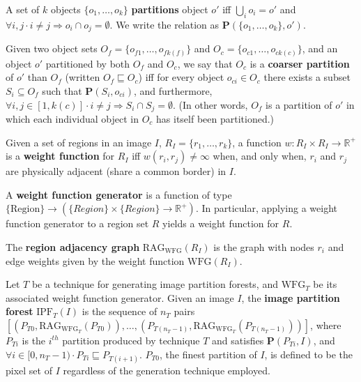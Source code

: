 \begin{definition}
A set of $k$ objects $\{o_1,\ldots,o_k\}$ \textbf{partitions} object $o'$ iff $\bigcup_i o_i = o'$ and $\forall i,j \cdot i \ne j \Rightarrow o_i \cap o_j = \emptyset$. We write the relation as $\mathbf{P}(\{o_1,\ldots,o_k\},o')$.
\end{definition}


\begin{definition}
Given two object sets $O_f = \{o_{f1},\ldots,o_{fk(f)}\}$ and $O_c = \{o_{c1},\ldots,o_{ck(c)}\}$, and an object $o'$ partitioned by both $O_f$ and $O_c$, we say that $O_c$ is a \textbf{coarser partition} of $o'$ than $O_f$ (written $O_f \sqsubseteq O_c$) iff for every object $o_{ci} \in O_c$ there exists a subset $S_i \subseteq O_f$ such that $\mathbf{P}(S_i, o_{ci})$, and furthermore, $\forall i,j \in [1,k(c)] \cdot i \ne j \Rightarrow S_i \cap S_j = \emptyset$. (In other words, $O_f$ is a partition of $o'$ in which each individual object in $O_c$ has itself been partitioned.)
\end{definition}


\begin{definition}
Given a set of regions in an image $I$, $R_I = \{r_1,\ldots,r_k\}$, a function $w : R_I \times R_I \rightarrow \mathbb{R}^{+}$ is a \textbf{weight function} for $R_I$ iff $w(r_i,r_j) \ne \infty$ when, and only when, $r_i$ and $r_j$ are physically adjacent (share a common border) in $I$.
\end{definition}


\begin{definition}
A \textbf{weight function generator} is a function of type $\{\mbox{Region}\} \rightarrow (\{Region\} \times \{Region\} \rightarrow \mathbb{R}^{+})$. In particular, applying a weight function generator to a region set $R$ yields a weight function for $R$.
\end{definition}

\begin{definition}
The \textbf{region adjacency graph} $\mbox{RAG}_{\mbox{WFG}}(R_I)$ is the graph with nodes $r_i$ and edge weights given by the weight function $\mbox{WFG}(R_I)$.
\end{definition}

\begin{definition}
Let $T$ be a technique for generating image partition forests, and $\mbox{WFG}_T$ be its associated weight function generator. Given an image $I$, the \textbf{image partition forest} $\mbox{IPF}_{T}(I)$ is the sequence of $n_T$ pairs $[(P_{T0},\mbox{RAG}_{\mbox{WFG}_T}(P_{T0})),\ldots,(P_{T(n_T-1)},\mbox{RAG}_{\mbox{WFG}_T}(P_{T(n_T-1)}))]$, where $P_{Ti}$ is the $i^{th}$ partition produced by technique $T$ and satisfies $\mathbf{P}(P_{Ti},I)$, and $\forall i \in [0,n_T-1) \cdot P_{Ti} \sqsubseteq P_{T(i+1)}$. $P_{T0}$, the finest partition of $I$, is defined to be the pixel set of $I$ regardless of the generation technique employed.
\end{definition}

